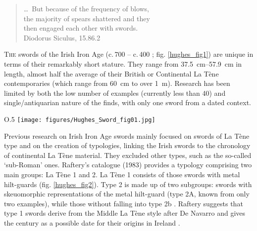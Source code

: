 \begin{quote}
\begin{flushright}
\ldots\ But because of the frequency of blows, \\
the majority of spears shattered and they\\
then engaged each other with swords.\\
{\footnotesize Diodorus Siculus, 15.86.2  }
\end{flushright}
\end{quote}
\vspace{2em}


\lettrine[nindent=0em,lines=3]{T}{he}  swords of the Irish Iron Age (c.\,700 \BC – c.\,400 \AD; fig. \ref{hughes_fig1}) are unique in terms of their remarkably short stature. They range from \SIrange[range-phrase= --]{37.5}{57.9}{\cm} in length, almost half the average of their British or Continental La Tène contemporaries (which range from \SI{60}{\cm} to over \SI{1}{\meter}). 
Research has been limited by both the low number of examples (currently less than \num{40}) and single/antiquarian nature of the finds, with only one sword from a dated context. 

\begin{wrapfigure}{O}{.5\textwidth}
\texttt{[image: figures/Hughes\_Sword\_fig01.jpg]} 
\caption{Distribution of Iron Age swords in Ireland and main sites mentioned in the text}
\label{hughes_fig1}
\end{wrapfigure}
Previous research on Irish Iron Age swords \parencites{Rynne1982}{Raftery1983} mainly focused on swords of La Tène type and on the creation of typologies, linking the Irish swords to the chronology of continental La Tène material. 
They excluded other types, such as the so-called ‘sub-Roman’ ones. 
Raftery’s catalogue (1983) provides a typology comprising two main groups: 
La Tène 1 and 2. La Tène 1 consists of those swords with metal hilt-guards (fig. \ref{hughes_fig2}). 
Type 2 is made up of two subgroups: 
swords with skeuomorphic representations of the metal hilt-guard (type 2A, known from only two examples), while those without falling into type 2b 
\parencite[83--106]{Raftery1983}. 
Raftery suggests that type 1 swords derive from the Middle La Tène style after De Navarro and gives the  century \BC as a possible date for their origins in Ireland 
\parencites{DeNavarro1972}[83]{Raftery1983}. 

